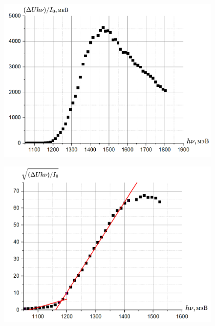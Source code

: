 \documentclass[a4paper, 12pt]{article}
\begin{document}
\begin{figure}[h!]
\begin{center}
\begin{minipage}[h!]{0.495\linewidth}
\includegraphics[width=1\linewidth]{img/l4.png}
\label{ris:experimoriginal} %
\end{minipage}
\hfill 
\begin{minipage}[h!]{0.495\linewidth}
\includegraphics[width=1\linewidth]{img/l5.png}

\label{ris:experimcoded}

\end{minipage}
\caption{}
\end{center}
\end{figure}
  
\end{document}
